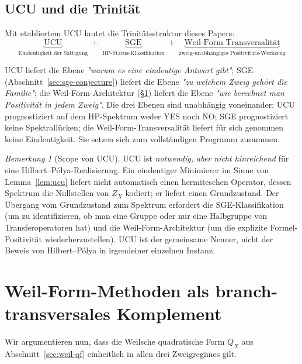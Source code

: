 \documentclass[11pt]{article}
\theoremstyle{definition}
\theoremstyle{remark}
\newtheorem{remark}[theorem]{Bemerkung}
\begin{document}
\subsection{UCU und die Trinität}
\label{sec:ucu-trinity}

Mit etabliertem UCU lautet die Trinitätsstruktur dieses Papers:
\[
  \underbrace{\text{UCU}}_{\text{Eindeutigkeit der Sättigung}}
  \;+\;
  \underbrace{\text{SGE}}_{\text{HP-Status-Klassifikation}}
  \;+\;
  \underbrace{\text{Weil-Form Transversalität}}_{\text{zweig-unabhängiges Positivitäts-Werkzeug}}
\]

UCU liefert die Ebene \emph{"warum es eine eindeutige Antwort gibt"}; SGE
(Abschnitt~\ref{sec:sge-conjecture}) liefert die Ebene \emph{"zu welchem Zweig gehört
die Familie"}; die Weil-Form-Architektur (\S\ref{sec:weil-transversal}) liefert die Ebene
\emph{"wie berechnet man Positivität in jedem Zweig"}. Die drei Ebenen sind
unabhängig voneinander: UCU prognostiziert auf dem HP-Spektrum weder YES noch NO;
SGE prognostiziert keine Spektrallücken; die Weil-Form-Transversalität liefert
für sich genommen keine Eindeutigkeit. Sie setzen sich zum vollständigen Programm zusammen.

\begin{remark}[Scope von UCU]\label{rem:ucu-scope}
UCU ist \emph{notwendig, aber nicht hinreichend} für eine Hilbert--P\'olya-Realisierung.
Ein eindeutiger Minimierer im Sinne von Lemma~\ref{lem:ucu} liefert nicht automatisch
einen hermiteschen Operator, dessen Spektrum die Nullstellen von $Z_X$ kodiert;
er liefert einen Grundzustand. Der Übergang vom Grundzustand zum Spektrum
erfordert die SGE-Klassifikation (um zu identifizieren, ob man eine Gruppe oder
nur eine Halbgruppe von Transferoperatoren hat) und die Weil-Form-Architektur
(um die explizite Formel-Positivität wiederherzustellen). UCU ist
der gemeinsame Nenner, nicht der Beweis von Hilbert--P\'olya in irgendeiner
einzelnen Instanz.
\end{remark}

\section{Weil-Form-Methoden als branch-transversales Komplement}
\label{sec:weil-transversal}

Wir argumentieren nun, dass die Weilsche quadratische Form $Q_X$ aus
Abschnitt~\ref{sec:weil-qf} einheitlich in allen drei Zweigregimes gilt.
\end{document}
